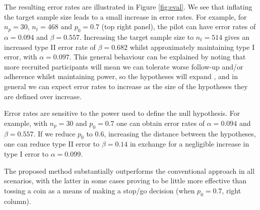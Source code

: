\documentclass[AMA,STIX1COL]{WileyNJD-v2}
\begin{document}
The resulting error rates are illustrated in Figure \ref{fig:eval}. We see that inflating the target sample size leads to a small increase in error rates. For example, for $n_p = 30$, $n_t = 468$ and $p_0 = 0.7$ (top right panel), the pilot can have error rates of $\alpha = 0.094$ and $\beta = 0.557$. Increasing the target sample size to $n_t = 514$ gives an increased type II error rate of $\beta = 0.682$ whilst approximately maintaining type I error, with $\alpha = 0.097$. This general behaviour can be explained by noting that more recruited participants will mean we can tolerate worse follow-up and/or adherence whilst maintaining power, so the hypotheses will expand , and in general we can expect error rates to increase as the size of the hypotheses they are defined over increase. 


Error rates are sensitive to the power used to define the null hypothesis. For example, with $n_p = 30$ and $p_0 = 0.7$ one can obtain error rates of $\alpha = 0.094$ and $\beta = 0.557$. If we reduce $p_0$ to 0.6, increasing the distance between the hypotheses, one can reduce type II error to $\beta = 0.14$ in exchange for a negligible increase in type I error to $\alpha = 0.099$. 

The proposed method substantially outperforms the conventional approach in all scenarios, with the latter in some cases proving to be little more effective than tossing a coin as a means of making a stop/go decision (when $p_0 = 0.7$, right column). 
\end{document}
